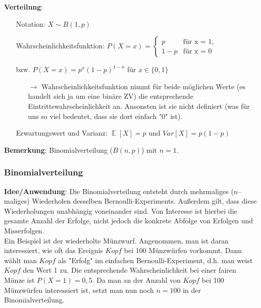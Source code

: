 \documentclass[a4paper]{article}
\DeclareMathOperator*{\E}{\mathbb{E}}
\begin{document}
\noindent \textbf{Verteilung}: 
\begin{itemize}
\item[] Notation: $X\sim B(1,p)$
\item[] Wahrscheinlichkeitsfunktion: $P(X=x) = \begin{cases}
			p & \text{für x = 1,}\\
            1-p & \text{für x = 0}
		 \end{cases}$ 
\item[] \hspace{4.5cm} bzw. $P(X=x)=p^x(1-p)^{1-x}$ für $x \in \{0,1\}$
	\begin{itemize}
	\item[$\rightarrow$] Wahrscheinlichkeitsfunktion nimmt für beide möglichen Werte (es handelt sich ja um eine binäre ZV) die entsprechende Eintrittswahrscheinlichkeit an. Ansonsten ist sie nicht definiert (was für uns so viel bedeutet, dass sie dort einfach "0" ist).
	\end{itemize}
\item[] Erwartungswert und Varianz: $\E[X]=p$ und $Var[X]=p(1-p)$

\end{itemize}
\noindent \textbf{Bemerkung}: Binomialverteilung ($B(n,p)$) mit $n=1$.

\subsubsection{Binomialverteilung} \label{sec:Bin}

\noindent \textbf{Idee/Anwendung}: Die Binomialverteilung entsteht durch mehrmaliges ($n$--maliges) Wiederholen desselben Bernoulli-Experiments. Außerdem gilt, dass diese Wiederholungen unabhängig voneinander sind. Von Interesse ist hierbei die gesamte Anzahl der Erfolge, nicht jedoch die konkrete Abfolge von Erfolgen und Misserfolgen. \\

\noindent Ein Beispiel ist der wiederholte Münzwurf. Angenommen, man ist daran interessiert, wie oft das Ereignis $Kopf$ bei 100 Münzwürfen vorkommt. Dann wählt man $Kopf$ als "Erfolg" im einfachen Bernoulli-Experiment, d.h. man weist $Kopf$ den Wert 1 zu. Die entsprechende Wahrscheinlichkeit bei einer fairen Münze ist $P(X=1)=0,5$. Da man an der Anzahl von $Kopf$ bei 100 Münzwürfen interessiert ist, setzt man nun noch $n=100$ in der Binomialverteilung. \\
\end{document}
